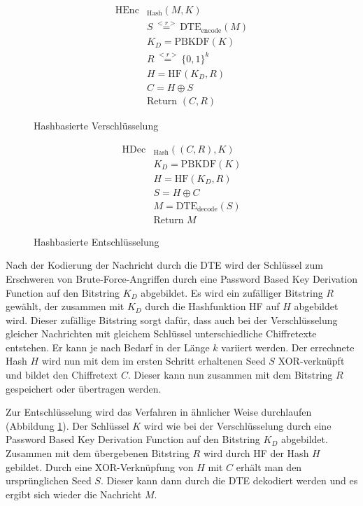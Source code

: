 \begin{figure}[h]
	\begin{minipage}[b]{0.5\textwidth}
		\begin{align*}
			\text{HEnc}&_{\text{Hash}}(M, K)\\
			&S \overset{<r>}{=} \text{DTE}_{\text{encode}}(M)\\ 	%
			&K_D = \text{PBKDF}(K)\\ 		%
			&R \overset{<r>}{=} \{0,1\}^k\\	%
			&H = \text{HF}(K_D,R)\\	%
			&C = H \oplus S\\	%
			&\text{Return } (C,R)
		\end{align*}
		\caption{Hashbasierte Verschlüsselung}
		\label{fig:HashEnc}
	\end{minipage}
	\begin{minipage}[b]{0.5\textwidth}
		\begin{align*}
			\text{HDec}&_{\text{Hash}}((C,R), K)\\
			&K_D = \text{PBKDF}(K)\\ 		%
			&H = \text{HF}(K_D,R)\\	%
			&S = H \oplus C\\	%
			&M = \text{DTE}_{\text{decode}}(S)\\ 	%
			&\text{Return } M
		\end{align*}
		\caption{Hashbasierte Entschlüsselung}
		\label{fig:HashDec}
	\end{minipage}
\end{figure}

Nach der Kodierung der Nachricht durch die DTE wird der Schlüssel zum Erschweren von Brute-Force-Angriffen durch eine Password Based Key Derivation Function auf den Bitstring \(K_D\) abgebildet. Es wird ein zufälliger Bitstring \(R\) gewählt, der zusammen mit \(K_D\) durch die Hashfunktion HF auf \(H\) abgebildet wird. Dieser zufällige Bitstring sorgt dafür, dass auch bei der Verschlüsselung gleicher Nachrichten mit gleichem Schlüssel unterschiedliche Chiffretexte entstehen. Er kann je nach Bedarf in der Länge \(k\) variiert werden. Der errechnete Hash \(H\) wird nun mit dem im ersten Schritt erhaltenen Seed \(S\) XOR-verknüpft und bildet den Chiffretext \(C\). Dieser kann nun zusammen mit dem Bitstring \(R\) gespeichert oder übertragen werden. 

Zur Entschlüsselung wird das Verfahren in ähnlicher Weise durchlaufen (Abbildung \ref{fig:HashDec}). Der Schlüssel \(K\) wird wie bei der Verschlüsselung durch eine Password Based Key Derivation Function auf den Bitstring \(K_D\) abgebildet. Zusammen mit dem übergebenen Bitstring \(R\) wird durch HF der Hash \(H\) gebildet. Durch eine XOR-Verknüpfung von \(H\) mit \(C\) erhält man den ursprünglichen Seed \(S\). Dieser kann dann durch die DTE  dekodiert werden und es ergibt sich wieder die Nachricht \(M\).

